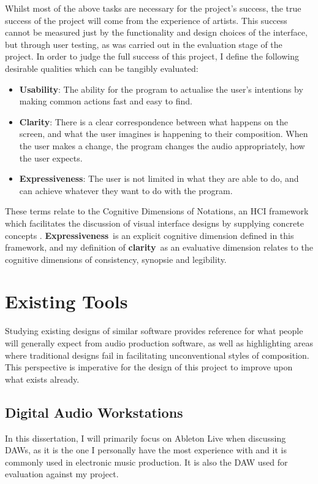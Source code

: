 \documentclass[12pt,a4paper,oneside,openright]{report}
\newcommand{\clarity}{\textbf{clarity}}
\newcommand{\Usability}{\textbf{Usability}}
\newcommand{\Clarity}{\textbf{Clarity}}
\newcommand{\Expressiveness}{\textbf{Expressiveness}}
\begin{document}
Whilst most of the above tasks are necessary for the project's success, the true success of the project will come from the experience of artists. This success cannot be measured just by the functionality and design choices of the interface, but through user testing, as was carried out in the evaluation stage of the project. In order to judge the full success of this project, I define the following desirable qualities which can be tangibly evaluated:
\begin{itemize}
    \item \Usability: The ability for the program to actualise the user's intentions by making common actions fast and easy to find.
    \item \Clarity: There is a clear correspondence between what happens on the screen, and what the user imagines is happening to their composition. When the user makes a change, the program changes the audio appropriately, how the user expects.
    \item \Expressiveness: The user is not limited in what they are able to do, and can achieve whatever they want to do with the program.
\end{itemize}

These terms relate to the Cognitive Dimensions of Notations, an HCI framework which facilitates the discussion of visual interface designs by supplying concrete concepts \cite{Green89}. \Expressiveness\ is an explicit cognitive dimension defined in this framework, and my definition of \clarity\ as an evaluative dimension relates to the cognitive dimensions of consistency, synopsie and legibility.

\section{Existing Tools}
Studying existing designs of similar software provides reference for what people will generally expect from audio production software, as well as highlighting areas where traditional designs fail in facilitating unconventional styles of composition. This perspective is imperative for the design of this project to improve upon what exists already.

\subsection{Digital Audio Workstations}
In this dissertation, I will primarily focus on Ableton Live when discussing DAWs, as it is the one I personally have the most experience with and it is commonly used in electronic music production. It is also the DAW used for evaluation against my project.
\end{document}
